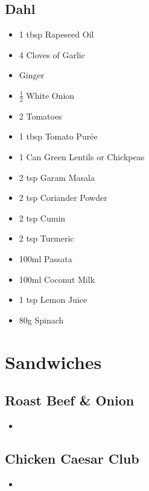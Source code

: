 \documentclass[11pt, english]{article}
\begin{document}
\newpage

	\subsection{Dahl}

	\begin{itemize}
        \setlength\itemsep{0cm}
                \item 1 tbsp Rapeseed Oil
		\item 4 Cloves of Garlic
		\item Ginger
		\item $\frac{1}{2}$ White Onion
		\item 2 Tomatoes
		\item 1 tbsp Tomato Pur\'{e}e
		\item 1 Can Green Lentils or Chickpeas
		\item 2 tsp Garam Masala
		\item 2 tsp Coriander Powder
		\item 2 tsp Cumin
		\item 2 tsp Turmeric
		\item 100ml Passata
		\item 100ml Coconut Milk
		\item 1 tsp Lemon Juice
		\item 80g Spinach
        \end{itemize}

\newpage

\section{Sandwiches}

	\subsection{Roast Beef \& Onion}

	\begin{itemize}
	\setlength\itemsep{0cm}
		\item 
	\end{itemize}

\newpage

	\subsection{Chicken Caesar Club}

	\begin{itemize}
	\setlength\itemsep{0cm}
		\item 
	\end{itemize}
\end{document}
